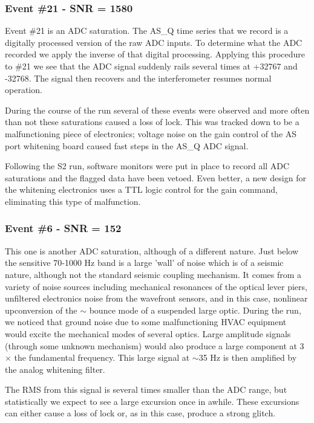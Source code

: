 \subsubsection{Event \#21 - SNR = 1580}

Event \#21 is an ADC saturation. The AS\_Q time series that we record is a digitally
processed version of the raw ADC inputs. To determine what the ADC recorded we apply
the inverse of that digital processing. Applying this procedure to \#21 we see that the
ADC signal suddenly rails several times at +32767 and -32768. The signal then recovers
and the interferometer resumes normal operation.

During the course of the run several of these events were observed and more often than
not these saturations caused a loss of lock. This was tracked down to be a malfunctioning
piece of electronics; voltage noise on the gain control of the AS port whitening board
caused fast steps in the AS\_Q ADC signal. 

Following the S2 run, software monitors were put in place to record all ADC saturations
and the flagged data have been vetoed. Even better, a new design for the whitening 
electronics uses a TTL logic control for the gain command, eliminating this type of 
malfunction.


\subsubsection{Event \#6 - SNR = 152}

This one is another ADC saturation, although of a different nature. Just below the
sensitive 70-1000 Hz band is a large 'wall' of noise which is of a seismic nature,
although not the standard seismic coupling mechanism. It comes from a variety of noise
sources including mechanical resonances of the optical lever piers, unfiltered
electronics noise from the wavefront sensors, and in this case, nonlinear upconversion
of the $\sim$ bounce mode of a suspended large optic. During the run, we noticed that
ground noise due to some malfunctioning HVAC equipment would excite the mechanical
modes of several optics. Large amplitude signals (through some unknown mechanism)
would also produce a large component at 3$\times$ the fundamental frequency. This
large signal at $\sim$35 Hz is then amplified by the analog whitening filter.

The RMS from this signal is several times smaller than the ADC range, but statistically
we expect to see a large excursion once in awhile. These excursions can either cause
a loss of lock or, as in this case, produce a strong glitch.

